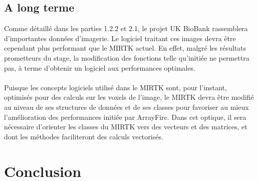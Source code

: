 \documentclass[10pt]{report}
\begin{document}
	\section{A long terme}
	Comme détaillé dans les parties 1.2.2 et 2.1, le projet UK BioBank rassemblera d'importantes données d'imagerie. Le logiciel traitant ces images devra être cependant plus performant que le MIRTK actuel. En effet, malgré les résultats prometteurs du stage, la modification des fonctions telle qu'initiée ne permettra pas, à terme d'obtenir un logiciel aux performances optimales. \\
	\\Puisque les concepts logiciels utilisé dans le MIRTK sont, pour l'instant, optimisés pour des calculs sur les voxels de l'image, le MIRTK devra être modifié au niveau de ses structures de données et de ses classes pour favoriser au mieux l'amélioration des performances initiée par ArrayFire. Dans cet optique, il sera nécessaire d'orienter les classes du MIRTK vers des vecteurs et des matrices, et dont les méthodes faciliteront des calculs vectorisés.
\chapter*{Conclusion} %
\end{document}
